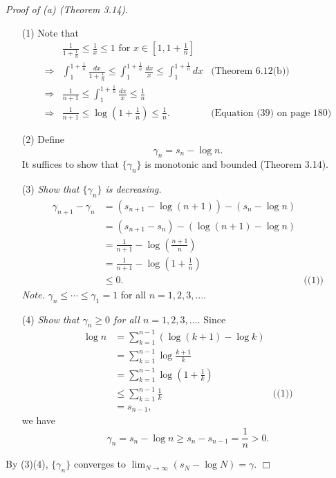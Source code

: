 \documentclass{article}
\begin{document}
\emph{Proof of (a) (Theorem 3.14).}
\begin{enumerate}
\item[(1)]
Note that
\begin{align*}
  &\frac{1}{1+\frac{1}{n}} \leq \frac{1}{x} \leq 1
    \text{ for } x \in \left[ 1,1+\frac{1}{n} \right] \\
  \Longrightarrow&
  \int_{1}^{1+\frac{1}{n}} \frac{dx}{1+\frac{1}{n}}
  \leq \int_{1}^{1+\frac{1}{n}} \frac{dx}{x}
  \leq \int_{1}^{1+\frac{1}{n}} dx
    &\text{(Theorem 6.12(b))} \\
  \Longrightarrow&
  \frac{1}{n+1}
  \leq \int_{1}^{1+\frac{1}{n}} \frac{dx}{x}
  \leq \frac{1}{n} \\
  \Longrightarrow&
  \frac{1}{n+1}
  \leq \log \left(1 + \frac{1}{n} \right)
  \leq \frac{1}{n}.
    &\text{(Equation (39) on page 180)}
\end{align*}

\item[(2)]
Define
\[
  \gamma_n = s_n - \log n.
\]
It suffices to show that $\{\gamma_n\}$ is monotonic and bounded (Theorem 3.14).

\item[(3)]
\emph{Show that $\{\gamma_n\}$ is decreasing.}
\begin{align*}
  \gamma_{n+1} - \gamma_n
  &= (s_{n+1} - \log(n+1)) - (s_n - \log n) \\
  &= (s_{n+1} - s_n) - (\log(n+1)-\log n) \\
  &= \frac{1}{n+1} - \log \left( \frac{n+1}{n} \right) \\
  &= \frac{1}{n+1} - \log \left(1 + \frac{1}{n} \right) \\
  &\leq 0.
    &\text{((1))}
\end{align*}
\emph{Note.} $\gamma_n \leq \cdots \leq \gamma_1 = 1$ for all $n=1,2,3,\ldots$.

\item[(4)]
\emph{Show that $\gamma_n \geq 0$ for all $n=1,2,3,\ldots$.}
Since
\begin{align*}
  \log n
  &= \sum_{k=1}^{n-1} (\log (k+1) - \log k) \\
  &= \sum_{k=1}^{n-1} \log \frac{k+1}{k} \\
  &= \sum_{k=1}^{n-1} \log \left( 1 + \frac{1}{k} \right) \\
  &\leq \sum_{k=1}^{n-1} \frac{1}{k}
    &\text{((1))} \\
  &= s_{n-1},
\end{align*}
we have
\[
  \gamma_n = s_n - \log n \geq s_n - s_{n-1} = \frac{1}{n} > 0.
\]
\end{enumerate}
By (3)(4), $\{\gamma_n\}$ converges to $\lim_{N \to \infty} (s_N - \log N) = \gamma$.
$\Box$ \\
\end{document}
